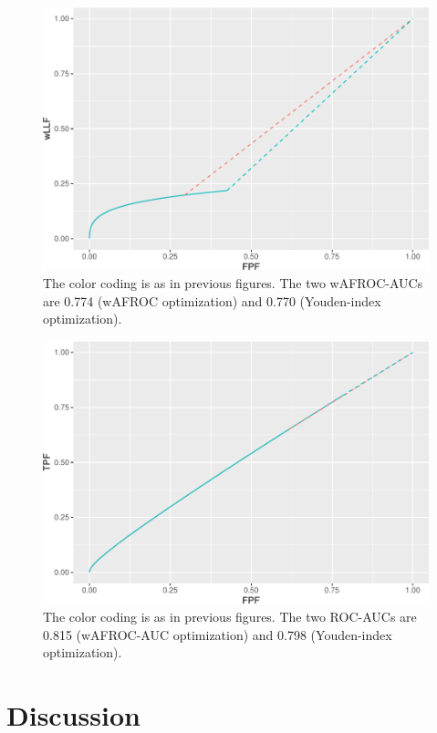 \documentclass[
]{book}
\begin{document}
\begin{figure}
\centering
\includegraphics{21-optim-op-point_files/figure-latex/optim-op-point-application-wafroc-1.pdf}
\caption{\label{fig:optim-op-point-application-wafroc}The color coding is as in previous figures. The two wAFROC-AUCs are 0.774 (wAFROC optimization) and 0.770 (Youden-index optimization).}
\end{figure}

\begin{figure}
\centering
\includegraphics{21-optim-op-point_files/figure-latex/optim-op-point-application-roc-1.pdf}
\caption{\label{fig:optim-op-point-application-roc}The color coding is as in previous figures. The two ROC-AUCs are 0.815 (wAFROC-AUC optimization) and 0.798 (Youden-index optimization).}
\end{figure}

\hypertarget{optim-op-point-discussion}{%
\section{Discussion}\label{optim-op-point-discussion}}
\end{document}
